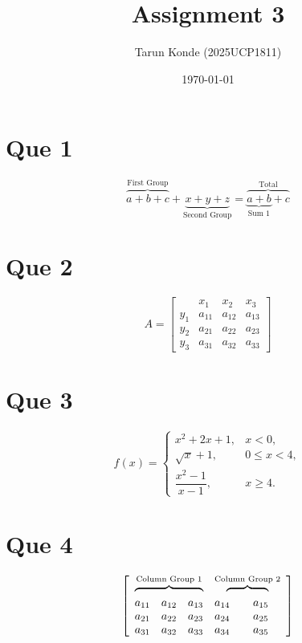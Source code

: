 \documentclass[11pt,a4paper]{article}
\title{Assignment 3}
\author{Tarun Konde (2025UCP1811)}
\date{\today}
\begin{document}
\maketitle

\section*{Que 1}
\[
    \overbrace{a + b + c}^{\text{First Group}}
    + \underbrace{x + y + z}_{\text{Second Group}}
    =
    \overbrace{\underbrace{a + b}_{\text{Sum 1}} + c}^{\text{Total}}
\]

\section*{Que 2}
\[
A =
\left[
\begin{array}{c|ccc}
         & x_1    & x_2    & x_3    \\ \hline
    y_1  & a_{11} & a_{12} & a_{13} \\
    y_2  & a_{21} & a_{22} & a_{23} \\
    y_3  & a_{31} & a_{32} & a_{33}
\end{array}
\right]
\]

\section*{Que 3}
\[
f(x) =
\begin{cases}
    x^2 + 2x + 1,          & x < 0, \\
    \sqrt{x} + 1,          & 0 \le x < 4, \\
    \dfrac{x^2 - 1}{x - 1}, & x \ge 4.
\end{cases}
\]

\section*{Que 4}
\[
\left[
\begin{array}{ccccc}
    \multicolumn{3}{c}{\overbrace{\hphantom{a_{11}\quad a_{12}\quad a_{13}}}^{\text{Column Group 1}}} &
    \multicolumn{2}{c}{\overbrace{\hphantom{a_{14}\quad a_{15}}}^{\text{Column Group 2}}} \\
    a_{11} & a_{12} & a_{13} & a_{14} & a_{15} \\
    a_{21} & a_{22} & a_{23} & a_{24} & a_{25} \\
    a_{31} & a_{32} & a_{33} & a_{34} & a_{35}
\end{array}
\right]
\]
\end{document}
